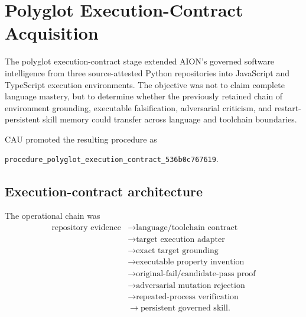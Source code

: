 
\section{Polyglot Execution-Contract Acquisition}
\label{sec:polyglot-execution-contract}

The polyglot execution-contract stage extended AION's governed software
intelligence from three source-attested Python repositories into JavaScript and
TypeScript execution environments.  The objective was not to claim complete
language mastery, but to determine whether the previously retained chain of
environment grounding, executable falsification, adversarial criticism, and
restart-persistent skill memory could transfer across language and toolchain
boundaries.

CAU promoted the resulting procedure as
\begin{center}
\texttt{procedure\_polyglot\_execution\_contract\_536b0c767619}.
\end{center}

\subsection{Execution-contract architecture}

The operational chain was
\begin{equation}
\begin{split}
\text{repository evidence}
&\rightarrow \text{language/toolchain contract} \\
&\rightarrow \text{target execution adapter} \\
&\rightarrow \text{exact target grounding} \\
&\rightarrow \text{executable property invention} \\
&\rightarrow \text{original-fail/candidate-pass proof} \\
&\rightarrow \text{adversarial mutation rejection} \\
&\rightarrow \text{repeated-process verification} \\
&\rightarrow \text{persistent governed skill}.
\end{split}
\label{eq:polyglot-chain}
\end{equation}

